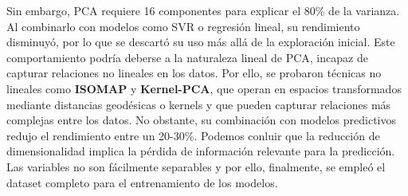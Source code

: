 \documentclass{article}
\begin{document}
Sin embargo, PCA requiere 16 componentes para explicar el 80\% de la varianza. Al combinarlo con modelos como SVR o regresión lineal, su rendimiento disminuyó, por lo que se descartó su uso 
más allá de la exploración inicial. Este comportamiento podría deberse a la naturaleza lineal de PCA, incapaz de capturar relaciones no lineales en los datos. Por ello, se probaron 
técnicas no lineales como \textbf{ISOMAP} y \textbf{Kernel-PCA}, que operan en espacios transformados mediante distancias geodésicas o kernels y que pueden capturar relaciones más complejas entre los datos. No obstante, su combinación con modelos predictivos redujo el rendimiento entre un 20-30\%. 
Podemos conluir que la reducción de dimensionalidad implica la pérdida de información relevante para la predicción. Las variables no son fácilmente separables y por ello, finalmente, se empleó el dataset completo para el entrenamiento de los modelos.
\end{document}

